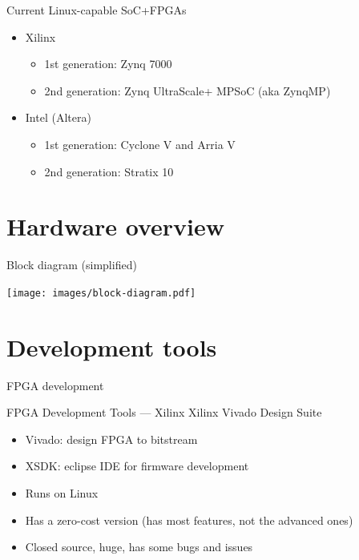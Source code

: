 \documentclass[xetex,table]{beamer}
\begin{document}
\begin{frame}{Current Linux-capable SoC+FPGAs}
  \begin{itemize}
  \item Xilinx
    \begin{itemize}
    \item 1st generation: Zynq 7000
    \item 2nd generation: Zynq UltraScale+ MPSoC (aka ZynqMP)
    \end{itemize}
  \item Intel (Altera)
    \begin{itemize}
    \item 1st generation: Cyclone V and Arria V
    \item 2nd generation: Stratix 10
    \end{itemize}
  \end{itemize}
\end{frame}

\section{Hardware overview}

\begin{frame}{Block diagram (simplified)}
  \begin{center}
    \texttt{[image: images/block-diagram.pdf]}
  \end{center}
\end{frame}

\section{Development tools}

\begin{frame}[standout]
  FPGA development
\end{frame}

\begin{frame}{FPGA Development Tools --- Xilinx}
  Xilinx Vivado Design Suite
  \begin{itemize}
  \item Vivado: design FPGA to bitstream
  \item XSDK: eclipse IDE for firmware development
  \item Runs on Linux
  \item Has a zero-cost version (has most features, not the advanced
    ones)
  \item Closed source, huge, has some bugs and issues
  \end{itemize}
\end{frame}
\end{document}
